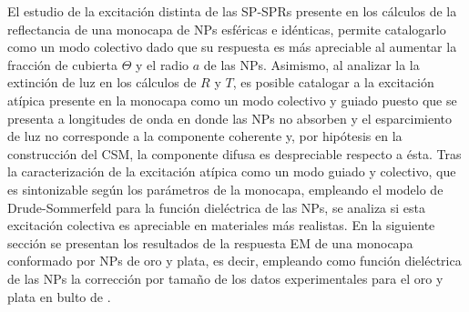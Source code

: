 El estudio de la excitación distinta de las SP-SPRs presente en los cálculos de la reflectancia de una monocapa de NPs esféricas e idénticas, permite catalogarlo como un modo colectivo dado que su respuesta es más apreciable al aumentar la fracción de cubierta $\Theta$ y el radio $a$ de las NPs. Asimismo, al analizar la la extinción de luz  en los cálculos de $R$ y $T$, es posible catalogar a la excitación atípica presente en la monocapa como un modo colectivo y guiado puesto que se presenta a longitudes de onda en donde las NPs no absorben y el esparcimiento de luz no corresponde a la componente coherente y, por hipótesis en la construcción del CSM, la componente difusa es despreciable respecto a ésta. Tras la caracterización de la excitación atípica como un modo guiado y colectivo, que es sintonizable según los parámetros de la monocapa, empleando el modelo de Drude-Sommerfeld para la función dieléctrica de las NPs, se analiza si esta excitación colectiva es apreciable en materiales más realistas. En la siguiente sección se presentan los resultados de la respuesta EM de una monocapa conformado por NPs de oro y plata, es decir, empleando como función dieléctrica de las NPs la corrección por tamaño de los datos experimentales para el oro y plata en bulto de \cite{johnson1972constants}.

